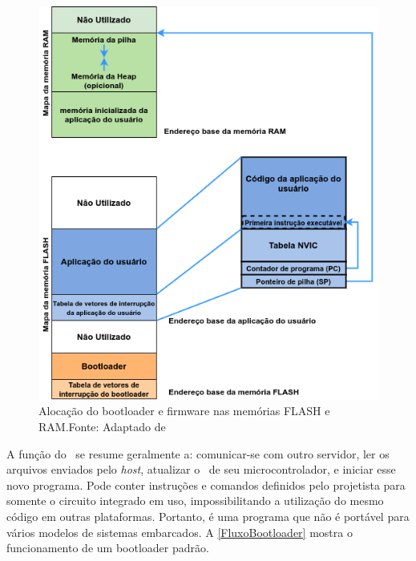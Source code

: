 \begin{figure}[H]
    \scriptsize
     \centering
     \includegraphics[scale=0.7]{dados/figuras/DiagBootloaderOriginal.png}
     \caption{Alocação do bootloader e firmware nas memórias FLASH e RAM.\newline Fonte: Adaptado de \cite{DavesDurlin2013}}
     \label{Diag_Bootloader}
\end{figure}

A função do \bootloader\ se resume geralmente a: comunicar-se com outro servidor, ler os arquivos enviados pelo \textit{host}, atualizar o \firmware\ de seu microcontrolador, e iniciar esse novo programa. 
Pode conter instruções e comandos definidos pelo projetista para somente o circuito integrado em uso, impossibilitando a utilização do mesmo código em outras plataformas.
Portanto, é uma programa que não é portável para vários modelos de sistemas embarcados. A \autoref{FluxoBootloader} mostra o funcionamento de um bootloader padrão. 

